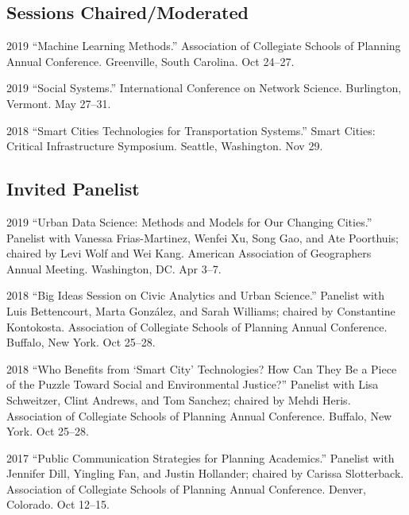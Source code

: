 \documentclass[12pt,letterpaper]{report}
\begin{document}
    \subsection*{Sessions Chaired/Moderated}

    \begin{tablist}

        \item[2019] \tab \enquote{Machine Learning Methods.} Association of Collegiate Schools of Planning Annual Conference. Greenville, South Carolina. Oct 24--27.
        
        \item[2019] \tab \enquote{Social Systems.} International Conference on Network Science. Burlington, Vermont. May 27--31.
        
        \item[2018] \tab \enquote{Smart Cities Technologies for Transportation Systems.} Smart Cities: Critical Infrastructure Symposium. Seattle, Washington. Nov 29.

    \end{tablist}

    \subsection*{Invited Panelist}

    \begin{tablist}

        \item[2019] \tab \enquote{Urban Data Science: Methods and Models for Our Changing Cities.} Panelist with Vanessa Frias-Martinez, Wenfei Xu, Song Gao, and Ate Poorthuis; chaired by Levi Wolf and Wei Kang. American Association of Geographers Annual Meeting. Washington, DC. Apr 3--7.
        
        \item[2018] \tab \enquote{Big Ideas Session on Civic Analytics and Urban Science.} Panelist with Luis Bettencourt, Marta González, and Sarah Williams; chaired by Constantine Kontokosta. Association of Collegiate Schools of Planning Annual Conference. Buffalo, New York. Oct 25--28.

        \item[2018] \tab \enquote{Who Benefits from \enquote{Smart City} Technologies? How Can They Be a Piece of the Puzzle Toward Social and Environmental Justice?} Panelist with Lisa Schweitzer, Clint Andrews, and Tom Sanchez; chaired by Mehdi Heris. Association of Collegiate Schools of Planning Annual Conference. Buffalo, New York. Oct 25--28.

        \item[2017] \tab \enquote{Public Communication Strategies for Planning Academics.} Panelist with Jennifer Dill, Yingling Fan, and Justin Hollander; chaired by Carissa Slotterback. Association of Collegiate Schools of Planning Annual Conference. Denver, Colorado. Oct 12--15.

    \end{tablist}
\end{document}
